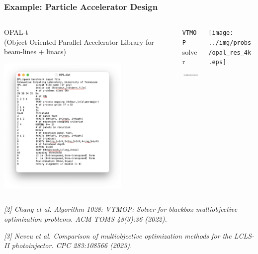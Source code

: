 \documentclass[aspectratio=169]{beamer}
\begin{document}
\begin{frame}\frametitle{Example: Particle Accelerator Design}
\begin{columns}
\begin{column}{.3\textwidth}
\begin{center}
{\large OPAL-t}\\
(Object Oriented Parallel Accelerator Library for beam-lines + linacs)
\end{center}
\begin{center}
\includegraphics[width=0.7\textwidth]{../img/probs/hpl_dat.png}\\
\end{center}
\end{column}
\begin{column}{.2\textwidth}
\begin{center}
{\tt VTMOP} solver
$$\xrightarrow{\hspace*{2cm}}$$
\end{center}
\end{column}
\begin{column}{.4\textwidth}
\texttt{[image: ../img/probs/opal\_res\_4k.eps]}
\end{column}
\end{columns}

\vfill

{\tiny\it
[2] Chang et al.
Algorithm 1028: VTMOP: Solver for blackbox multiobjective optimization problems.
{\sl ACM TOMS 48(3):36 (2022).}\\
}

\medskip

{\tiny\it
[3] Neveu et al.
Comparison of multiobjective optimization methods for the LCLS-II photoinjector.
{\sl CPC 283:108566 (2023).}\\
}

\end{frame}
\end{document}
